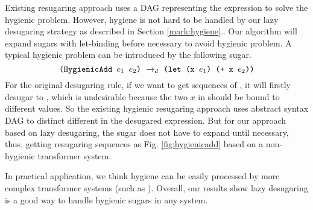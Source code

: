 Existing resugaring approach \cite{hygienic} uses a DAG representing the expression to solve the hygienic problem. However, hygiene is not hard to be handled by our lazy desugaring strategy as described in Section \ref{mark:hygiene}.. Our algorithm will expand sugars with let-binding before necessary to avoid hygienic problem.
A typical hygienic problem can be introduced by the following sugar.
\[
\texttt{(HygienicAdd $e_1$ $e_2$)} ~\rightarrow_d~ \texttt{(let (x $e_1$) (+ x $e_2$))}
\]
For the original desugaring rule, if we want to get sequences of , it will firstly desugar to , which is undesirable because the two $x$ in  should be bound to different values. So the existing hygienic resugaring approach uses abstract syntax DAG to distinct different  in the desugared expression. But for our approach based on lazy desugaring, the  sugar does not have to expand until necessary, thus, getting resugaring sequences as Fig.  \ref{fig:hygienicadd} based on a non-hygienic transformer system.



In practical application, we think hygiene can be easily processed by more complex transformer systems (such as \cite{10.5555/1792878.1792884}). Overall, our results show lazy desugaring is a good way to handle hygienic sugars in any system.


